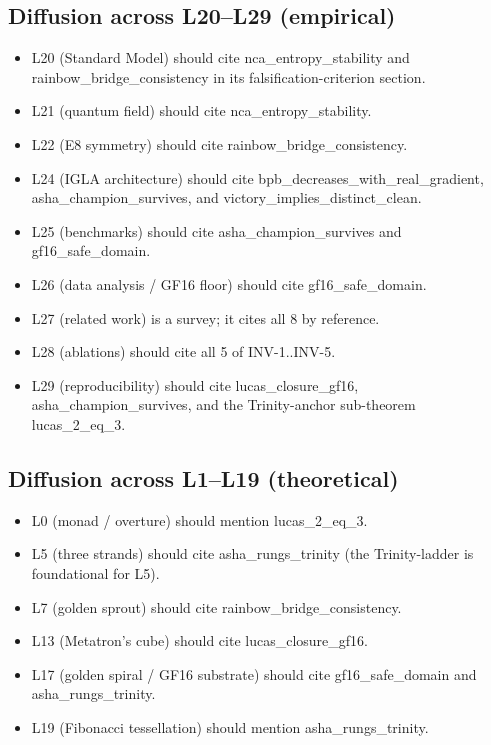 \subsection{Diffusion across L20–L29 (empirical)}
\label{sec:32-diff-empirical}

\begin{itemize}
    \item L20 (Standard Model) should cite nca\_entropy\_stability and
          rainbow\_bridge\_consistency in its falsification-criterion
          section.
    \item L21 (quantum field) should cite nca\_entropy\_stability.
    \item L22 (E8 symmetry) should cite rainbow\_bridge\_consistency.
    \item L24 (IGLA architecture) should cite bpb\_decreases\_with\_real\_gradient,
          asha\_champion\_survives, and victory\_implies\_distinct\_clean.
    \item L25 (benchmarks) should cite asha\_champion\_survives and
          gf16\_safe\_domain.
    \item L26 (data analysis / GF16 floor) should cite gf16\_safe\_domain.
    \item L27 (related work) is a survey; it cites all 8 by reference.
    \item L28 (ablations) should cite all 5 of INV-1..INV-5.
    \item L29 (reproducibility) should cite lucas\_closure\_gf16,
          asha\_champion\_survives, and the Trinity-anchor sub-theorem
          lucas\_2\_eq\_3.
\end{itemize}

\subsection{Diffusion across L1–L19 (theoretical)}
\label{sec:32-diff-theory}

\begin{itemize}
    \item L0 (monad / overture) should mention lucas\_2\_eq\_3.
    \item L5 (three strands) should cite asha\_rungs\_trinity (the
          Trinity-ladder is foundational for L5).
    \item L7 (golden sprout) should cite rainbow\_bridge\_consistency.
    \item L13 (Metatron's cube) should cite lucas\_closure\_gf16.
    \item L17 (golden spiral / GF16 substrate) should cite
          gf16\_safe\_domain and asha\_rungs\_trinity.
    \item L19 (Fibonacci tessellation) should mention asha\_rungs\_trinity.
\end{itemize}

